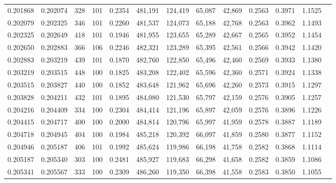 \begin{tabular}{rrrrrrrrrrrrr}
0.201868 & 0.202074 &   328 & 101 &                                     0.2354 & 481,191 & 124,419 &  65,087 &  42,869 & 0.2563 & 0.3971 & 1.1525 \\
0.202079 & 0.202325 &   346 & 101 &                                     0.2260 & 481,537 & 124,073 &  65,188 &  42,768 & 0.2563 & 0.3962 & 1.1493 \\
0.202325 & 0.202649 &   418 & 101 &                                     0.1946 & 481,955 & 123,655 &  65,289 &  42,667 & 0.2565 & 0.3952 & 1.1454 \\
0.202650 & 0.202883 &   366 & 106 &                                     0.2246 & 482,321 & 123,289 &  65,395 &  42,561 & 0.2566 & 0.3942 & 1.1420 \\
0.202883 & 0.203219 &   439 & 101 &                                     0.1870 & 482,760 & 122,850 &  65,496 &  42,460 & 0.2569 & 0.3933 & 1.1380 \\
0.203219 & 0.203515 &   448 & 100 &                                     0.1825 & 483,208 & 122,402 &  65,596 &  42,360 & 0.2571 & 0.3924 & 1.1338 \\
0.203515 & 0.203827 &   440 & 100 &                                     0.1852 & 483,648 & 121,962 &  65,696 &  42,260 & 0.2573 & 0.3915 & 1.1297 \\
0.203828 & 0.204211 &   432 & 101 &                                     0.1895 & 484,080 & 121,530 &  65,797 &  42,159 & 0.2576 & 0.3905 & 1.1257 \\
0.204216 & 0.204409 &   334 & 100 &                                     0.2304 & 484,414 & 121,196 &  65,897 &  42,059 & 0.2576 & 0.3896 & 1.1226 \\
0.204415 & 0.204717 &   400 & 100 &                                     0.2000 & 484,814 & 120,796 &  65,997 &  41,959 & 0.2578 & 0.3887 & 1.1189 \\
0.204718 & 0.204945 &   404 & 100 &                                     0.1984 & 485,218 & 120,392 &  66,097 &  41,859 & 0.2580 & 0.3877 & 1.1152 \\
0.204946 & 0.205187 &   406 & 101 &                                     0.1992 & 485,624 & 119,986 &  66,198 &  41,758 & 0.2582 & 0.3868 & 1.1114 \\
0.205187 & 0.205340 &   303 & 100 &                                     0.2481 & 485,927 & 119,683 &  66,298 &  41,658 & 0.2582 & 0.3859 & 1.1086 \\
0.205341 & 0.205567 &   333 & 100 &                                     0.2309 & 486,260 & 119,350 &  66,398 &  41,558 & 0.2583 & 0.3850 & 1.1055 \\

\end{tabular}
